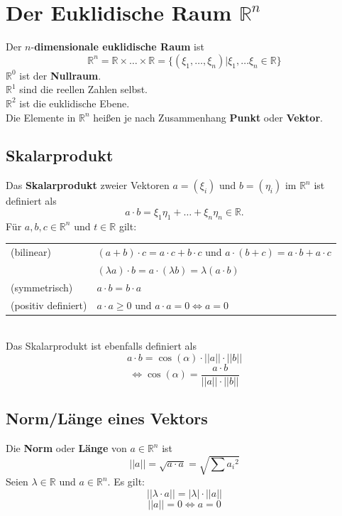 \documentclass[12pt]{article}
\begin{document}
\section{Der Euklidische Raum $\mathbb{R}^n$}
Der $n$-\textbf{dimensionale euklidische Raum} ist
\[\mathbb{R}^n = \mathbb{R} \times \dots \times \mathbb{R} = \{(\xi_1, \dots, \xi_n) | \xi_1, \dots \xi_n \in \mathbb{R}\}\]
$\mathbb{R}^0$ ist der \textbf{Nullraum}. \\
$\mathbb{R}^1$ sind die reellen Zahlen selbst. \\
$\mathbb{R}^2$ ist die euklidische Ebene. \\
Die Elemente in $\mathbb{R}^n$ heißen je nach Zusammenhang \textbf{Punkt} oder \textbf{Vektor}.
\subsection{Skalarprodukt}
Das \textbf{Skalarprodukt} zweier Vektoren $a = (\xi_i)$ und $b = (\eta_i)$ im $\mathbb{R}^n$ ist definiert als
\[a \cdot b = \xi_1 \eta_1 + \dots + \xi_n \eta_n \in \mathbb{R}.\]
Für $a,b,c \in \mathbb{R}^n$ und $t \in \mathbb{R}$ gilt: \\
\newline
\begin{tabular}{l l}
    (bilinear) & $(a+b) \cdot c = a \cdot c + b \cdot c$ und $a \cdot (b+c) = a \cdot b + a \cdot c$ \\
    & $(\lambda a) \cdot b = a \cdot (\lambda b) = \lambda(a \cdot b)$ \\
    (symmetrisch) & $a \cdot b = b \cdot a$ \\
    (positiv definiert) & $a \cdot a \geq 0$ und $a \cdot a = 0 \Leftrightarrow a = 0$
\end{tabular} \\
Das Skalarprodukt ist ebenfalls definiert als
\[a \cdot b = \cos(\alpha)\cdot||a||\cdot||b||\]
\[\Leftrightarrow \cos(\alpha) = \frac{a \cdot b}{||a|| \cdot ||b||}\]
\subsection{Norm/Länge eines Vektors}
Die \textbf{Norm} oder \textbf{Länge} von $a \in \mathbb{R}^n$ ist \[||a||= \sqrt{a \cdot a} = \sqrt{\sum {a_i}^2}\]
Seien $\lambda \in \mathbb{R}$ und $a \in \mathbb{R}^n$. Es gilt:
\[||\lambda \cdot a|| = |\lambda| \cdot ||a||\]
\[||a|| = 0 \Longleftrightarrow a = 0\]
\end{document}
